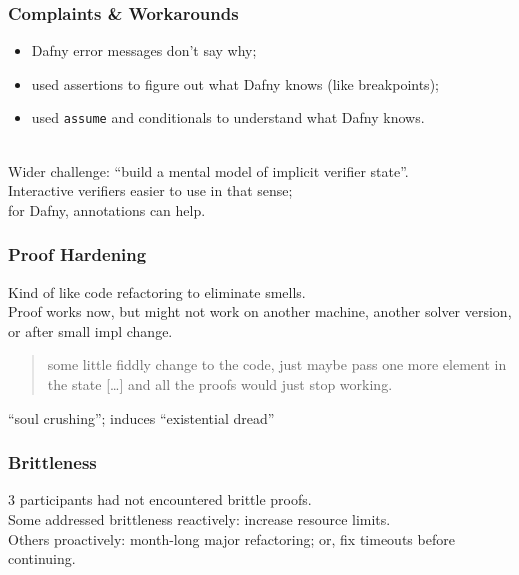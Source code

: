 \documentclass{beamer}
\newenvironment{changemargin}[1]{%
  \begin{list}{}{%
    \setlength{\topsep}{0pt}%
    \setlength{\leftmargin}{#1}%
    \setlength{\rightmargin}{1em}
    \setlength{\listparindent}{\parindent}%
    \setlength{\itemindent}{\parindent}%
    \setlength{\parsep}{\parskip}%
  }%
  \item[]}{\end{list}}
\begin{document}
\begin{frame}
  \frametitle{Complaints \& Workarounds}
  \Large
  \begin{changemargin}{1cm}
    \begin{itemize}
    \item Dafny error messages don't say why;
    \item used assertions to figure out what Dafny knows (like breakpoints);
    \item used \texttt{assume} and conditionals to understand what Dafny knows.
    \end{itemize}
    ~\\[1em]
    Wider challenge: ``build a mental model of implicit verifier state''.\\
    Interactive verifiers easier to use in that sense; \\
    for Dafny, annotations can help.
  \end{changemargin}
\end{frame}

\usebackgroundtemplate{}

\begin{frame}
  \frametitle{Proof Hardening}
  \Large
  \begin{changemargin}{1cm}
    Kind of like code refactoring to eliminate smells.\\[2em]
    Proof works now, but might not work on another machine, another solver version, or after small impl change.\\[1em]
    \begin{quote}
some little fiddly change to the code,
just maybe pass one more element in the state [\ldots] and all the proofs
would just stop working.
    \end{quote}

    ``soul crushing''; induces ``existential dread''
  \end{changemargin}
\end{frame}

\begin{frame}
  \frametitle{Brittleness}
  \Large
  \begin{changemargin}{1cm}
    3 participants had not encountered brittle proofs.\\[1em]
    Some addressed brittleness reactively: increase resource limits.\\
    Others proactively: month-long major refactoring; or, fix timeouts before continuing.
  \end{changemargin}
\end{frame}
\end{document}
